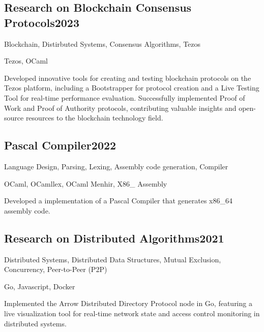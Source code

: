 \documentclass[a4paper, 12pt]{article}
\begin{document}
\subsection {{Research on Blockchain Consensus Protocols}\hfill 2023}
\begin{zitemize}
\item Blockchain, Distirbuted Systems, Consensus Algorithms, Tezos
\item Tezos, OCaml
\item Developed innovative tools for creating and testing blockchain protocols on the Tezos platform, including a Bootstrapper for protocol creation and a Live Testing Tool for real-time performance evaluation. Successfully implemented Proof of Work and Proof of Authority protocols, contributing valuable insights and open-source resources to the blockchain technology field.
\end{zitemize}

\vspace*{6pt}
\subsection {{Pascal Compiler}\hfill 2022}
\begin{zitemize}
\item Language Design, Parsing, Lexing, Assembly code generation, Compiler
\item OCaml, OCamllex, OCaml Menhir, X86\_ Assembly
\item Developed a implementation of a Pascal Compiler that generates x86\_64 assembly code.
\end{zitemize}


\vspace*{6pt}
\subsection {{Research on Distributed Algorithms}\hfill 2021}
\begin{zitemize}
\item Distributed Systems, Distributed Data Structures, Mutual Exclusion, Concurrency, Peer-to-Peer (P2P)
\item Go, Javascript, Docker
\item Implemented the Arrow Distributed Directory Protocol node in Go, featuring a live visualization tool for real-time network state and access control monitoring in distributed systems.
\end{zitemize}
\end{document}
